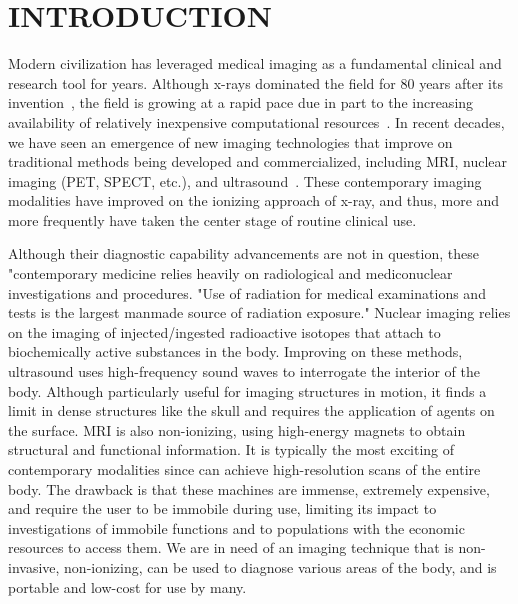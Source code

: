 
\chapter{INTRODUCTION} %
\label{chap:introduction}

Modern civilization has leveraged medical imaging as a fundamental clinical and research tool for years. Although x-rays dominated the field for 80 years after its invention~\cite{Gunderman2012}, the field is growing at a rapid pace due in part to the increasing availability of relatively inexpensive computational resources~\cite{Iglehart2006}. In recent decades, we have seen an emergence of new imaging technologies that improve on traditional methods being developed and commercialized, including MRI, nuclear imaging (PET, SPECT, etc.), and ultrasound~\cite{Suetens2017}. These contemporary imaging modalities have improved on the ionizing approach of x-ray, and thus, more and more frequently have taken the center stage of routine clinical use. 

Although their diagnostic capability advancements are not in question, these "contemporary medicine relies heavily on radiological and mediconuclear investigations and procedures. "Use of radiation for medical examinations and tests is the largest manmade source of radiation exposure." Nuclear imaging relies on the imaging of injected/ingested radioactive isotopes that attach to biochemically active substances in the body. Improving on these methods, ultrasound uses high-frequency sound waves to interrogate the interior of the body. Although particularly useful for imaging structures in motion, it finds a limit in dense structures like the skull and requires the application of agents on the surface. MRI is also non-ionizing, using high-energy magnets to obtain structural and functional information. It is typically the most exciting of contemporary modalities since can achieve high-resolution scans of the entire body. The drawback is that these machines are immense, extremely expensive, and require the user to be immobile during use, limiting its impact to investigations of immobile functions and to populations with the economic resources to access them. We are in need of an imaging technique that is non-invasive, non-ionizing, can be used to diagnose various areas of the body, and is portable and low-cost for use by many.

